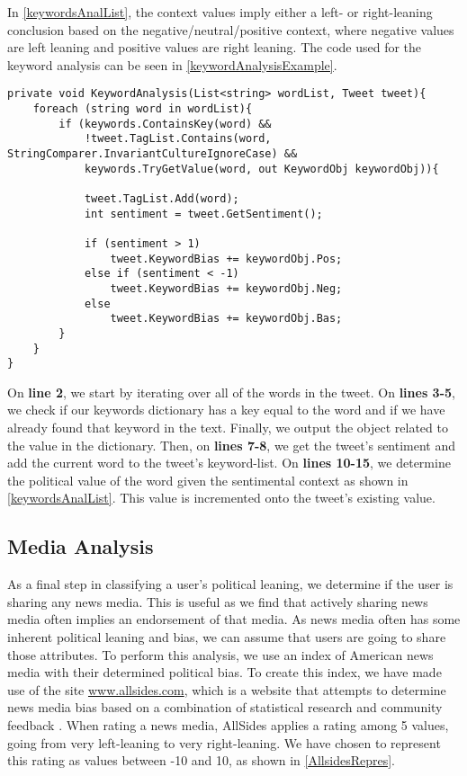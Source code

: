In \autoref{keywordsAnalList}, the context values imply either a left- or
right-leaning conclusion based on the negative/neutral/positive context, where
negative values are left leaning and positive values are right leaning. The code used for
the keyword analysis can be seen in \autoref{keywordAnalysisExample}.\\

\begin{minipage}[H]{\linewidth}
\begin{lstlisting}[caption = Method for handling the keyword analysis., label =
keywordAnalysisExample] 
private void KeywordAnalysis(List<string> wordList, Tweet tweet){
	foreach (string word in wordList){
    	if (keywords.ContainsKey(word) && 
            !tweet.TagList.Contains(word, StringComparer.InvariantCultureIgnoreCase) && 
            keywords.TryGetValue(word, out KeywordObj keywordObj)){
                        
        	tweet.TagList.Add(word);
            int sentiment = tweet.GetSentiment();

            if (sentiment > 1)
            	tweet.KeywordBias += keywordObj.Pos;
            else if (sentiment < -1)
            	tweet.KeywordBias += keywordObj.Neg;
            else
            	tweet.KeywordBias += keywordObj.Bas;
		}
	}
}
\end{lstlisting}
\end{minipage}

On \textbf{line 2}, we start by iterating over all of the words in the tweet. On
\textbf{lines 3-5}, we check if our keywords dictionary has a key equal to the
word and if we have already found that keyword in the text. Finally, we output
the  object related to the value in the dictionary. Then, on
\textbf{lines 7-8}, we get the tweet's sentiment and  add the current word to
the tweet's keyword-list. On \textbf{lines 10-15}, we determine the political value
of the word given the sentimental context as shown in
\autoref{keywordsAnalList}. This value is incremented onto the tweet's existing
 value.

\subsection{Media Analysis}
As a final step in classifying a user's political leaning, we determine if the
user is sharing any news media. This is useful as we find that actively sharing
news media often implies an endorsement of that media. As news media often has
some inherent political leaning and bias, we can assume that users are going to
share those attributes. To perform this analysis, we use an index of
American news media with their determined political bias. To create
this index, we have made use of the site \url{www.allsides.com}, which is a
website that attempts to determine news media bias based on a combination of
statistical research and community feedback \citep{allSidesMedia}. When rating a
news media, AllSides applies a rating among 5 values, going from very
left-leaning to very right-leaning. We have chosen to represent
this rating as values between -10 and 10, as shown in
\autoref{AllsidesRepres}.\\

